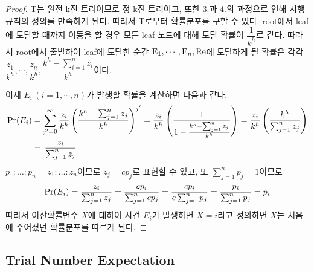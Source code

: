 \documentclass[11pt]{article}
\begin{document}
\doublespacing
\begin{proof}
T는 완전 k진 트리이므로 정 k진 트리이고, 또한 3.과 4.의 과정으로 인해 시행 규칙의 정의를 만족하게 된다. 따라서 T로부터 확률분포를 구할 수 있다. root에서 leaf에 도달할 때까지 이동을 할 경우 모든 leaf 노드에 대해 도달 확률이 $\dfrac{1}{k^{h}}$로 같다. 따라서 root에서 출발하여 leaf에 도달한 순간 $\textnormal{E}_1,\cdots,\textnormal{E}_n,\textnormal{Re}$에 도달하게 될 확률은 각각 $\dfrac{z_{1}}{k^{h}},\cdots,\dfrac{z_{n}}{k^{h}},\dfrac{k^{h}-\sum_{i=1}^{n}z_{i}}{k^{h}}$이다.

이제 $E_{i}\,(i=1,\cdots,n)$가 발생할 확률을 계산하면 다음과 같다.
\[
\begin{split}
\textnormal{Pr}(E_{i}) & = \sum_{j'=0}^{\infty} \frac{z_{i}}{k^{h}}\left(\frac{k^{h}-\sum_{j=1}^{n}z_{j}}{k^{h}}\right)^{j'} = \frac{z_{i}}{k^{h}}\left(\frac{1}{1 - \frac{k^{h}-\sum_{j=1}^{n}z_{j}}{k^{h}}}\right) = \frac{z_{i}}{k^{h}}\left(\frac{k^{h}}{\sum_{j=1}^{n}z_{j}}\right)\\
& = \,\frac{z_{i}}{\sum_{j=1}^{n}z_{j}}
\end{split}
\]
$p_{1}:\dots:p_{n} = z_{1}:\dots:z_{n}$이므로 $z_{j} = cp_{j}$로 표현할 수 있고, 또 $\sum_{j=1}^{n}p_{j} = 1$이므로
\[\textnormal{Pr}(E_{i}) = \frac{z_{i}}{\sum_{j=1}^{n}z_{j}} = \frac{cp_{i}}{\sum_{j=1}^{n}cp_{j}} = \frac{cp_{i}}{c\sum_{j=1}^{n}p_{j}} = \frac{p_{i}}{\sum_{j=1}^{n}p_{j}} = p_{i}\]
따라서 이산확률변수 $X$에 대하여 사건 $E_{i}$가 발생하면 $X = i$라고 정의하면 $X$는 처음에 주어졌던 확률분포를 따르게 된다.
\end{proof}

\subsection{Trial Number Expectation}






\end{document}
